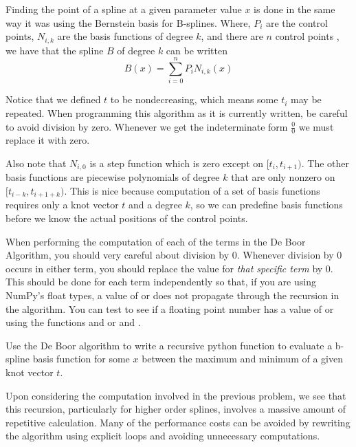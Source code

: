 Finding the point of a spline at a given parameter value $x$ is done in the same way it was using the Bernstein basis for B-splines.
Where, $P_i$ are the control points, $N_{i,k}$ are the basis functions of degree $k$, and there are $n$ control points , we have that the spline $B$ of degree $k$ can be written
\[B\left(x\right) = \sum_{i=0}^n P_i N_{i,k}\left(x\right)\]

Notice that we defined $t$ to be nondecreasing, which means some $t_i$ may be repeated.
When programming this algorithm as it is currently written, be careful to avoid division by zero.
Whenever we get the indeterminate form $\frac{0}{0}$ we must replace it with zero.

Also note that $N_{i,0}$ is a step function which is zero except on $[t_i, t_{i+1})$.
The other basis functions are piecewise polynomials of degree $k$ that are only nonzero on $[t_{i-k}, t_{i+1+k})$.
This is nice because computation of a set of basis functions requires only a knot vector $t$ and a degree $k$, so we can predefine basis functions before we know the actual positions of the control points.

\begin{warn}
When performing the computation of each of the terms in the De Boor Algorithm, you should very careful about division by $0$.
Whenever division by $0$ occurs in either term, you should replace the value for \emph{that specific term} by $0$.
This should be done for each term independently so that, if you are using NumPy's float types, a value of  or  does not propagate through the recursion in the algorithm.
You can test to see if a floating point number has a value of  or  using the functions  and  or  and .
\end{warn}

\begin{problem}
Use the De Boor algorithm to write a recursive python function to evaluate a b-spline basis function for some $x$ between the maximum and minimum of a given knot vector $t$.
\end{problem}

Upon considering the computation involved in the previous problem, we see that this recursion, particularly for higher order splines, involves a massive amount of repetitive calculation.
Many of the performance costs can be avoided by rewriting the algorithm using explicit loops and avoiding unnecessary computations.


